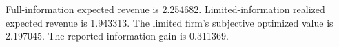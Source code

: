 Full-information expected revenue is 2.254682. Limited-information realized expected revenue is 1.943313. The limited firm's subjective optimized value is 2.197045. The reported information gain is 0.311369.
